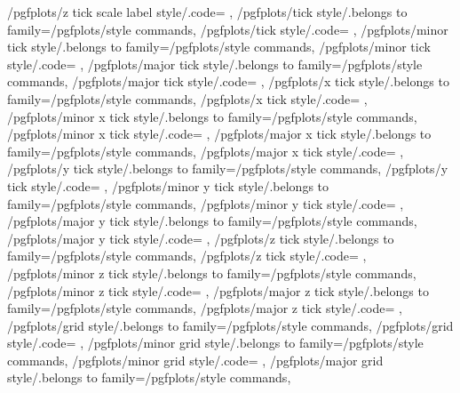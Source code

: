 {	/pgfplots/z tick scale label style/.code={%
	},
	/pgfplots/tick style/.belongs to family=/pgfplots/style commands,
	/pgfplots/tick style/.code={%
	},
	/pgfplots/minor tick style/.belongs to family=/pgfplots/style commands,
	/pgfplots/minor tick style/.code={%
	},
	/pgfplots/major tick style/.belongs to family=/pgfplots/style commands,
	/pgfplots/major tick style/.code={%
	},
	/pgfplots/x tick style/.belongs to family=/pgfplots/style commands,
	/pgfplots/x tick style/.code={%
	},
	/pgfplots/minor x tick style/.belongs to family=/pgfplots/style commands,
	/pgfplots/minor x tick style/.code={%
	},
	/pgfplots/major x tick style/.belongs to family=/pgfplots/style commands,
	/pgfplots/major x tick style/.code={%
	},
	/pgfplots/y tick style/.belongs to family=/pgfplots/style commands,
	/pgfplots/y tick style/.code={%
	},
	/pgfplots/minor y tick style/.belongs to family=/pgfplots/style commands,
	/pgfplots/minor y tick style/.code={%
	},
	/pgfplots/major y tick style/.belongs to family=/pgfplots/style commands,
	/pgfplots/major y tick style/.code={%
	},
	/pgfplots/z tick style/.belongs to family=/pgfplots/style commands,
	/pgfplots/z tick style/.code={%
	},
	/pgfplots/minor z tick style/.belongs to family=/pgfplots/style commands,
	/pgfplots/minor z tick style/.code={%
	},
	/pgfplots/major z tick style/.belongs to family=/pgfplots/style commands,
	/pgfplots/major z tick style/.code={%
	},
	/pgfplots/grid style/.belongs to family=/pgfplots/style commands,
	/pgfplots/grid style/.code={%
	},
	/pgfplots/minor grid style/.belongs to family=/pgfplots/style commands,
	/pgfplots/minor grid style/.code={%
	},
	/pgfplots/major grid style/.belongs to family=/pgfplots/style commands,
}
